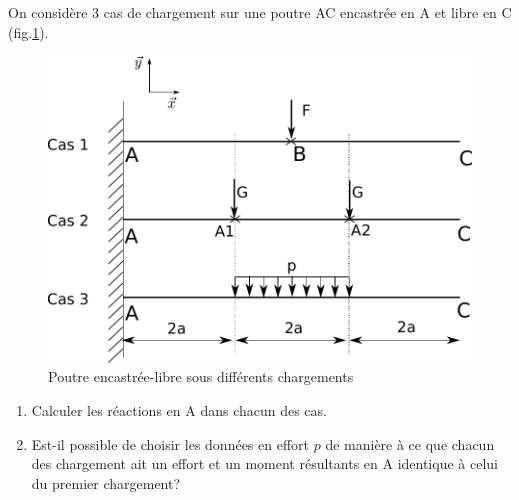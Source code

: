 \documentclass[lecture.tex]{subfiles}
\begin{document}

On considère 3 cas de chargement sur une poutre AC encastrée en A et libre en C (fig.\ref{Poutre_EL}).

\begin{figure}[h]
  \centering
  \includegraphics[scale=0.6]{exo1.pdf}
  \caption{Poutre encastrée-libre sous différents chargements}
  \label{Poutre_EL}
\end{figure}

\begin{enumerate}
  \item Calculer les réactions en A dans chacun des cas.
  \item Est-il possible de choisir les données en effort $p$ de manière à ce que chacun des chargement ait un effort et un moment résultants en A identique à celui du premier chargement?
\end{enumerate}

\finexercice
\end{document}
